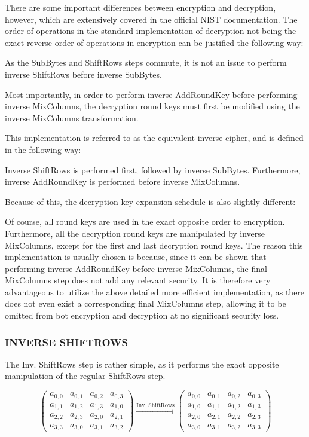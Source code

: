 \documentclass[12pt, a4paper]{report}
\theoremstyle{definition}
\theoremstyle{remark}
\begin{document}
There are some important differences between encryption and decryption, however, which are extensively covered in the official NIST documentation\cite{NISTAnnouncement}. The order of operations in the standard implementation of decryption not being the exact reverse order of operations in encryption can be justified the following way:

As the SubBytes and ShiftRows steps commute, it is not an issue to perform inverse ShiftRows before inverse SubBytes.

Most importantly, in order to perform inverse AddRoundKey before performing inverse MixColumns, the decryption round keys must first be modified using the inverse MixColumns transformation.

This implementation is referred to as the equivalent inverse cipher, and is defined in the following way\cite{NISTAnnouncement}:

Inverse ShiftRows is performed first, followed by inverse SubBytes. Furthermore, inverse AddRoundKey is performed before inverse MixColumns.

Because of this, the decryption key expansion schedule is also slightly different\cite{EquivalentDecryption}:

Of course, all round keys are used in the exact opposite order to encryption. Furthermore, all the decryption round keys are manipulated by inverse MixColumns, except for the first and last decryption round keys. The reason this implementation is usually chosen is because, since it can be shown that performing inverse AddRoundKey before inverse MixColumns, the final MixColumns step does not add any relevant security. It is therefore very advantageous to utilize the above detailed more efficient implementation, as there does not even exist a corresponding final MixColumns step, allowing it to be omitted from bot encryption and decryption at no significant security loss\cite{EquivalentDecryption}\cite{Rijndael}.

\subsubsection{INVERSE SHIFTROWS}
The Inv. ShiftRows step is rather simple, as it performs the exact opposite manipulation of the regular ShiftRows step.

\[
\left( \begin{array}{cccc}
a_{0,0} & a_{0,1} & a_{0,2} & a_{0,3} \\
a_{1,1} & a_{1,2} & a_{1,3} & a_{1,0} \\
a_{2,2} & a_{2,3} & a_{2,0} & a_{2,1} \\
a_{3,3} & a_{3,0} & a_{3,1} & a_{3,2}\end{array} \right)
\xrightarrow{\text{Inv. ShiftRows}}
\left( \begin{array}{cccc}
a_{0,0} & a_{0,1} & a_{0,2} & a_{0,3} \\
a_{1,0} & a_{1,1} & a_{1,2} & a_{1,3} \\
a_{2,0} & a_{2,1} & a_{2,2} & a_{2,3} \\
a_{3,0} & a_{3,1} & a_{3,2} & a_{3,3}\end{array} \right)
\]
\end{document}
